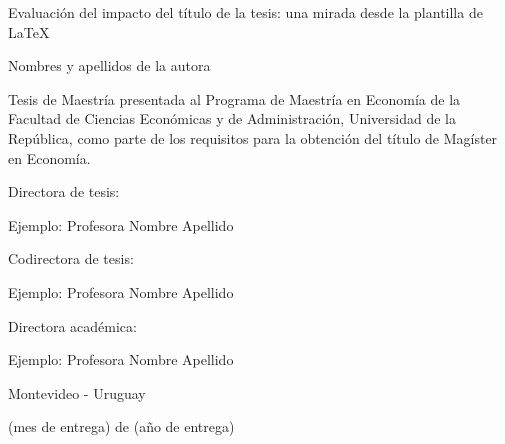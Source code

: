 \begin{center}

\noindent{}

\vspace{0.5cm}

\Huge Evaluación del impacto del título de la tesis: una mirada desde la plantilla de \LaTeX

\vspace{2cm}

\Large Nombres y apellidos de la autora

\vspace{1cm}

\end{center}

\normalsize Tesis de Maestría presentada al Programa de Maestría en Economía de la Facultad de Ciencias Económicas y de Administración, Universidad de la República, como parte de los requisitos para la obtención del título de Magíster en Economía.

\vspace{1cm}

\begin{center}

Directora de tesis: 

\vspace{1.5mm}

Ejemplo: Profesora Nombre Apellido

\vspace{6mm}

Codirectora de tesis: 

\vspace{1.5mm}

Ejemplo: Profesora Nombre Apellido

\vspace{6mm}

Directora académica: 

\vspace{1.5mm}

Ejemplo: Profesora Nombre Apellido

\vspace{1.5cm}

Montevideo - Uruguay

\vspace{0.5cm}

(mes de entrega) de (año de entrega)

\end{center}

\newpage
